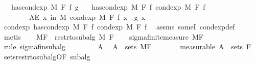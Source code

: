 \begin{isabellebody}
\ \ \ {\isachardoublequoteopen}has{\isacharunderscore}{\kern0pt}cond{\isacharunderscore}{\kern0pt}exp\ M\ F\ f\ g{\isachardoublequoteclose}\isanewline
\ \ \ {\isachardoublequoteopen}has{\isacharunderscore}{\kern0pt}cond{\isacharunderscore}{\kern0pt}exp\ M\ F\ f\ {\isacharparenleft}{\kern0pt}cond{\isacharunderscore}{\kern0pt}exp\ M\ F\ f{\isacharparenright}{\kern0pt}{\isachardoublequoteclose}\isanewline
\ \ \ \ \ \ \ \ {\isachardoublequoteopen}AE\ x\ in\ M{\isachardot}{\kern0pt}\ cond{\isacharunderscore}{\kern0pt}exp\ M\ F\ f\ x\ {\isacharequal}{\kern0pt}\ g\ x{\isachardoublequoteclose}\isanewline
%
\isadelimproof
%
\endisadelimproof
%
\isatagproof
{}\isamarkupfalse%
\ {\isacharminus}{\kern0pt}\isanewline
\ \ \isamarkupfalse%
\ cond{\isacharunderscore}{\kern0pt}exp{\isacharcolon}{\kern0pt}\ {\isachardoublequoteopen}has{\isacharunderscore}{\kern0pt}cond{\isacharunderscore}{\kern0pt}exp\ M\ F\ f\ {\isacharparenleft}{\kern0pt}cond{\isacharunderscore}{\kern0pt}exp\ M\ F\ f{\isacharparenright}{\kern0pt}{\isachardoublequoteclose}\ \isamarkupfalse%
\ assms\ someI\ cond{\isacharunderscore}{\kern0pt}exp{\isacharunderscore}{\kern0pt}def\ \isamarkupfalse%
\ metis\isanewline
\ \ \isamarkupfalse%
\ {\isacharquery}{\kern0pt}MF\ {\isacharequal}{\kern0pt}\ {\isachardoublequoteopen}restr{\isacharunderscore}{\kern0pt}to{\isacharunderscore}{\kern0pt}subalg\ M\ F{\isachardoublequoteclose}\isanewline
\ \ \isamarkupfalse%
\ sigma{\isacharunderscore}{\kern0pt}finite{\isacharunderscore}{\kern0pt}measure\ {\isacharquery}{\kern0pt}MF\ \isamarkupfalse%
\ {\isacharparenleft}{\kern0pt}rule\ sigma{\isacharunderscore}{\kern0pt}fin{\isacharunderscore}{\kern0pt}subalg{\isacharparenright}{\kern0pt}\isanewline
\ \ \isacommand{{\isacharbraceleft}{\kern0pt}}\isamarkupfalse%
\isanewline
\ \ \ \ \isamarkupfalse%
\ A\ \isamarkupfalse%
\ {\isachardoublequoteopen}A\ {\isasymin}\ sets\ {\isacharquery}{\kern0pt}MF{\isachardoublequoteclose}\isanewline
\ \ \ \ \isamarkupfalse%
\ \isamarkupfalse%
\ {\isacharbrackleft}{\kern0pt}measurable{\isacharbrackright}{\kern0pt}{\isacharcolon}{\kern0pt}\ {\isachardoublequoteopen}A\ {\isasymin}\ sets\ F{\isachardoublequoteclose}\ \isamarkupfalse%
\ sets{\isacharunderscore}{\kern0pt}restr{\isacharunderscore}{\kern0pt}to{\isacharunderscore}{\kern0pt}subalg{\isacharbrackleft}{\kern0pt}OF\ subalg{\isacharbrackright}{\kern0pt}\ \isamarkupfalse%

\end{isabellebody}
